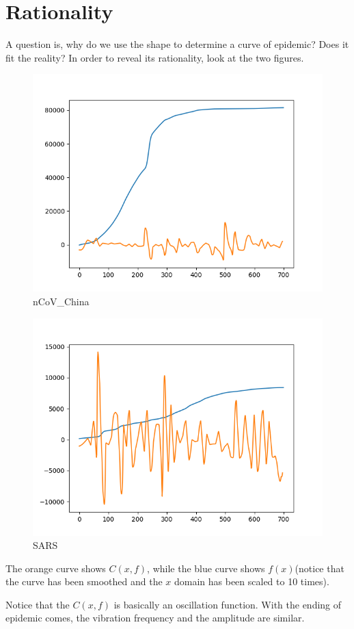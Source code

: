 \documentclass[]{article}
\begin{document}
\section{Rationality}
\par
A question is, why do we use the shape to determine a curve of epidemic? Does it fit the reality? In order to reveal its rationality, look at the two figures.

\begin{figure}[H]
	\centering
	\includegraphics[width=0.7\linewidth]{Figure_nCoV_China}
	\caption{nCoV\_China}
	\label{fig:nCoV_China}
\end{figure}
\begin{figure}[H]
	\centering
	\includegraphics[width=0.7\linewidth]{Figure_SARS}
	\caption{SARS}
	\label{fig:SARS}
\end{figure}
\par
The orange curve shows $C(x, f)$, while the blue curve shows $f(x)$(notice that the curve has been smoothed and the $x$ domain has been scaled to 10 times).
\par
Notice that the $C(x, f)$ is basically an oscillation function. With the ending of epidemic comes, the vibration frequency and the amplitude are similar.
\end{document}
